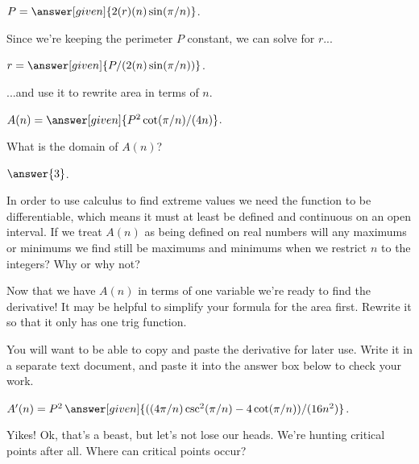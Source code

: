 \documentclass[handout,nooutcomes]{ximera}
\begin{document}
\begin{problem}
$P = \answer[given]{2(r)(n)\sin(\pi/n)}$.

Since we're keeping the perimeter $P$ constant, we can solve for $r$...

$r = \answer[given]{P/(2(n)\sin(\pi/n))}$.

...and use it to rewrite area in terms of $n$.

$A(n) = \answer[given]{P^2\cot(\pi/n)/(4n)}$.

\bigskip

What is the domain of $A(n)$? 

  $\answer{3}$.

\begin{freeResponse}
In order to use calculus to find extreme values we need the function to be differentiable, which means it must at least be defined and continuous on an open interval. If we treat $A(n)$ as being defined on real numbers will any maximums or minimums we find still be maximums and minimums when we restrict $n$ to the integers? Why or why not?
\end{freeResponse}

\bigskip

\hspace{2cm}Now that we have $A(n)$ in terms of one variable we're ready to find the derivative! It may be helpful to simplify your formula for the area first. Rewrite it so that it only has one trig function.

You will want to be able to copy and paste the derivative for later use. Write it in a separate text document, and paste it into the answer box below to check your work.

$A'(n) = P^2\,\answer[given]{((4\pi/n)\csc^2(\pi/n)-4\cot(\pi/n))/(16n^2)}$.

\end{problem}

\bigskip

\begin{problem}
\hspace{2cm}Yikes! Ok, that's a beast, but let's not lose our heads. We're hunting critical points after all. Where can critical points occur?
\begin{selectAll}
\end{selectAll}
\end{problem}
\end{document}

